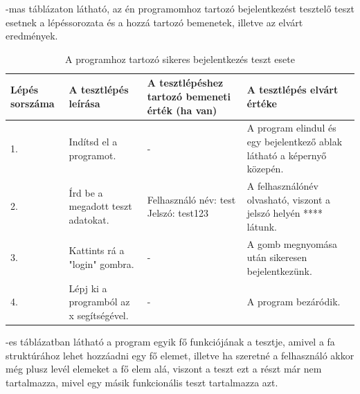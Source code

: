 -mas táblázaton látható, az én programomhoz tartozó bejelentkezést tesztelő teszt esetnek a lépéssorozata és a hozzá tartozó bemenetek, illetve az elvárt eredmények.

\begin{table} [h]
	\begin{center}
		\resizebox{\textwidth}{!} {
			\begin{tabular}{ |p{3cm}|p{5cm}|p{5cm}|p{5cm}| } 
				\hline
				Lépés sorszáma & A tesztlépés leírása & A tesztlépéshez tartozó bemeneti érték (ha van) & A tesztlépés elvárt értéke  \\ 
				\hline
				1. & Indítsd el a programot. & - & A program elindul és egy bejelentkező ablak látható a képernyő közepén.  \\ 
				\hline
				2. & Írd be a megadott teszt adatokat. & Felhasználó név: test \newline Jelszó: test123 & A felhasználónév olvasható, viszont a jelszó helyén **** látunk.\\ 
				\hline
				3. & Kattints rá a "login" gombra. & - & A gomb megnyomása után sikeresen bejelentkezünk. \\
				\hline
				4. & Lépj ki a programból az x segítségével. & - & A program bezáródik. \\
				\hline
			\end{tabular}
		}
	\end{center}
	\caption{A programhoz tartozó sikeres bejelentkezés teszt esete}
	\label{table:successcase}
\end{table}

-es táblázatban látható a program egyik fő funkciójának a tesztje, amivel a fa struktúrához lehet hozzáadni egy fő elemet, illetve ha szeretné a felhasználó akkor még plusz levél elemeket a fő elem alá, viszont a teszt ezt a részt már nem tartalmazza, mivel egy másik funkcionális teszt tartalmazza azt.

